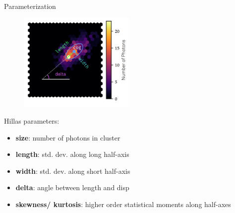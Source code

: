 \begin{frame}[t]{Parameterization}
    \begin{multicols}{2}
        \begin{figure}
            \centering
            \includegraphics[width=0.5\textwidth]{fig/hillas.png}
        \end{figure}
    \columnbreak
Hillas parameters: \\
    \begin{itemize}
        \setlength\itemsep{1em}
        \item \textbf{{\color{tugreen} size}}: number of photons in cluster
        \item \textbf{{\color{tugreen} length}}: std. dev. along long half-axis
        \item \textbf{{\color{tugreen} width}}: std. dev. along short half-axis
        \item \textbf{{\color{tugreen} delta}}: angle between length and disp
        \item \textbf{{\color{tugreen} skewness/ kurtosis}}: higher order statistical moments along half-axes
    \end{itemize}
    \end{multicols}
\end{frame}

